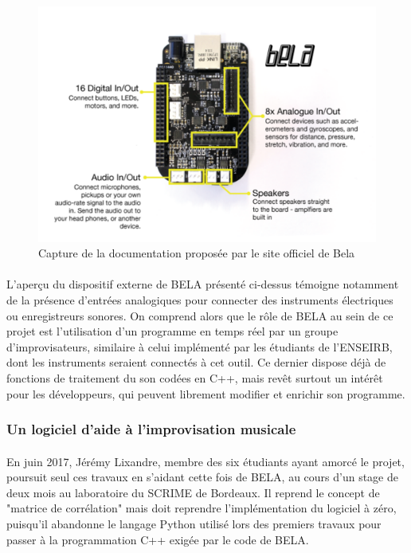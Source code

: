 \begin{figure}[h]
	\centering
	\includegraphics[scale=0.2]{bela.png}
	\caption{Capture de la documentation proposée par le site officiel de Bela}
	\label{bela}
\end{figure}

\paragraph{}
L'aperçu du dispositif externe de BELA présenté ci-dessus témoigne
notamment de la présence d'entrées analogiques pour connecter des
instruments électriques ou enregistreurs sonores. On comprend alors
que le rôle de BELA au sein de ce projet est l'utilisation d'un
programme en temps réel par un groupe d'improvisateurs,
similaire à celui implémenté par les étudiants de l'ENSEIRB, dont les
instruments seraient connectés à cet outil. Ce dernier dispose déjà de
fonctions de traitement du son codées en C++, mais revêt surtout un intérêt
pour les développeurs, qui peuvent librement modifier et enrichir son
programme.

\subsubsection{Un logiciel d'aide à l'improvisation musicale}
\paragraph{}
En juin 2017, Jérémy Lixandre, membre des six étudiants ayant amorcé
le projet, poursuit seul ces travaux en s'aidant cette fois de BELA,
au cours d'un stage de deux mois au laboratoire du SCRIME de
Bordeaux. Il reprend le concept de "matrice de corrélation" mais
doit reprendre l'implémentation du logiciel à zéro, puisqu'il
abandonne le langage Python utilisé lors des premiers travaux pour
passer à la programmation C++ exigée par le code de BELA.
